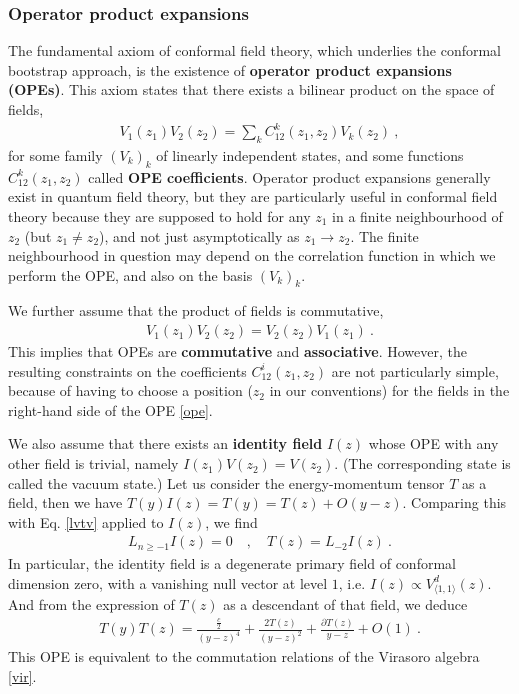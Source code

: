 \documentclass[12pt, a4paper]{article}
\newcommand{\myindex}[1]{\textbf{\boldmath #1}}
\theoremstyle{break}
\begin{document}
\subsubsection{Operator product expansions}\label{sec:ope}

The fundamental axiom of conformal field theory, which underlies the conformal bootstrap approach, is the existence of \myindex{operator product expansions (OPEs)}. This axiom states that there exists a bilinear product on the space of fields, 
\begin{align}
  \boxed{V_1(z_1)V_2(z_2) = \sum_k C^k_{12}(z_1,z_2) V_k(z_2)}\ ,
  \label{ope}
 \end{align}
 for some family $(V_k)_k$ of linearly independent states, and 
some functions $C^k_{12}(z_1,z_2)$ called \myindex{OPE coefficients}. Operator product expansions generally exist in quantum field theory, but they are particularly useful in conformal field theory because they are supposed to hold for any $z_1$ in a finite neighbourhood of $z_2$ (but $z_1\neq z_2$), and not just asymptotically as $z_1\to z_2$. The finite neighbourhood in question may depend on the correlation function in which we perform the OPE, and also on the basis $(V_k)_k$. 

We further assume that the product of fields is commutative,
\begin{align}
 \boxed{V_1(z_1)V_2(z_2) = V_2(z_2)V_1(z_1)}\ .
 \label{comm}
\end{align}
This implies that OPEs are \myindex{commutative} and \myindex{associative}. However, the resulting constraints on the coefficients $C^i_{12}(z_1,z_2)$ are not particularly simple, because of having to choose a position ($z_2$ in our conventions) for the fields in the right-hand side of the OPE \eqref{ope}. 

We also assume that there exists an \myindex{identity field} $I(z)$ whose OPE with any other field is trivial, namely $I(z_1)V(z_2) = V(z_2)$. (The corresponding state is called the vacuum state.) Let us consider the energy-momentum tensor $T$ as a field, then we have 
$
 T(y)I(z) = T(y) = T(z)  + O(y-z)
$. 
Comparing this with Eq. \eqref{lvtv} applied to $I(z)$, we find 
\begin{align}
 L_{n\geq -1} I(z) = 0 \quad , \quad T(z) = L_{-2}I(z)\ .
\end{align}
In particular, the identity field is a degenerate primary field of conformal dimension zero, with a vanishing null vector at level $1$, i.e. $I(z) \propto V^d_{\langle 1,1\rangle}(z)$. And from the expression of $T(z)$ as a descendant of that field, we deduce
\begin{align}
 T(y)T(z) = \frac{\frac{c}{2}}{(y-z)^4} + \frac{2T(z)}{(y-z)^2} + \frac{\partial T(z)}{y-z} + O(1)\ .
\label{tt}
\end{align}
This OPE is equivalent to the commutation relations of the Virasoro algebra \eqref{vir}.
\end{document}
